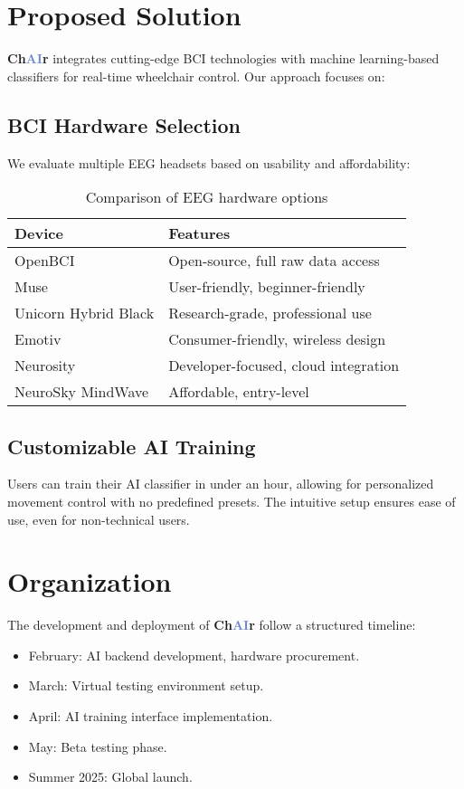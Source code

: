 \documentclass[a4paper]{article}
\newcommand\chair{\textbf{Ch\textcolor[HTML]{6B8ACD}{AI}r}\xspace}
\begin{document}
\section{Proposed Solution}

\chair integrates cutting-edge BCI technologies with machine learning-based
classifiers for real-time wheelchair control. Our approach focuses on:

\subsection{BCI Hardware Selection}
We evaluate multiple EEG headsets based on usability and affordability:
\begin{table}[ht]
    \centering
    \begin{tabular}{ll}
    \toprule
    Device & Features \\
    \midrule
    OpenBCI & Open-source, full raw data access \\
    Muse & User-friendly, beginner-friendly \\
    Unicorn Hybrid Black & Research-grade, professional use \\
    Emotiv & Consumer-friendly, wireless design \\
    Neurosity & Developer-focused, cloud integration \\
    NeuroSky MindWave & Affordable, entry-level \\
    \bottomrule
    \end{tabular}
    \caption{Comparison of EEG hardware options}
\end{table}

\subsection{Customizable AI Training}
Users can train their AI classifier in under an hour, allowing for
personalized movement control with no predefined presets. The intuitive
setup ensures ease of use, even for non-technical users.

\section{Organization}

The development and deployment of \chair follow a structured timeline:
\begin{itemize}
    \item February: AI backend development, hardware procurement.
    \item March: Virtual testing environment setup.
    \item April: AI training interface implementation.
    \item May: Beta testing phase.
    \item Summer 2025: Global launch.
\end{itemize}
\end{document}
